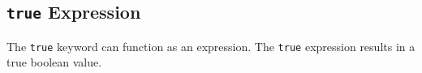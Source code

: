 
\subsection{\texttt{true} Expression}
{
	The \texttt{true} keyword can function as an expression.
	The \texttt{true} expression results in a true boolean value.
}
